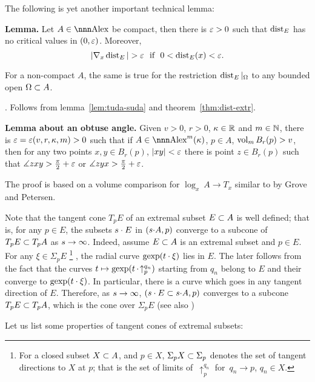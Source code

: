 \documentclass{article}
\begin{document}
The following is yet another important technical lemma:

\begin{thm} {\bf Lemma.} {\rm \cite[3.1(2)]{perelman-petrunin:extremal}}
\label{lem:dist-to-extr}
Let $A\in\Alex$ be compact, then there is $\varepsilon>0$
such that $\operatorname{dist}_E$ has no critical values in $(0,\varepsilon)$. 
Moreover,
$$|\nabla_x\dist_E|>\eps\ \ \text{if}\ \ 0<\dist_E(x)<\eps.$$

For a non-compact $A$,  the same is true for the restriction
 $\operatorname{dist}_E|_\Omega$ to any bounded open $\Omega\subset A$.
\end{thm}



\Proof. Follows from lemma~\ref{lem:tuda-suda} and
theorem~\ref{thm:dist-extr}.\qeds


\begin{thm}{\bf Lemma about an obtuse angle.} \label{lem:tuda-suda} Given $v>0$, $r>0$,
$\kappa\in\mathbb{R}$ and $m\in\mathbb{N}$, there is $\varepsilon=\varepsilon(v,r,\kappa,m)>0$ such that if
$A\in\Alex^m(\kappa)$, $p\in A$, $\operatorname{vol}_m B_r(p)>v$, then for any two points
$x,y\in B_r(p)$, $|x y|<\varepsilon$ there is point $z\in B_r(p)$ such that $\measuredangle z x
y>\tfrac\pi2+\varepsilon$ or $\measuredangle z y x>\tfrac\pi2+\varepsilon$.
\end{thm}
The proof is based on a volume comparison for $\log_x\:A\to T_x$ similar to \cite[lemma 1.3]{grove-petersen:finiteness} by Grove and Petersen.

Note that the tangent cone \label{T_pE}$T_p E$ of an extremal subset $E\subset A$ is well defined; 
that is,
for any $p\in E$, the subsets $s\cdot E$ in $(s{\cdot} A,p)$ converge to a subcone of $T_p E\subset T_p A$ as
$s\to\infty$.
Indeed, assume $E\subset A$ is an extremal subset and $p\in E$.
For any $\xi\in \Sigma_p E$%
\footnote{\label{U_pX}For a closed subset $X\subset A$, and $p\in X$, $\Sigma_p X\subset \Sigma_p$ denotes the set of tangent directions to $X$ at $p$;
that is the
set of limits of~$\uparrow_p^{q_n}$ for~$q_n\to p$, $q_n\in X$.}%
, the radial curve $\operatorname{gexp}(t\cdot\xi)$ lies in $E$.%
The later follows from the fact that the curves 
$t\mapsto\operatorname{gexp}(t\,\cdot\!\uparrow_p^{q_n})$ starting from $q_n$ belong to $E$
and their converge to $\operatorname{gexp}(t\cdot\xi)$.
In particular, there is a curve which goes in any tangent direction of $E$.
Therefore, as $s\to\infty$,  $(s\cdot E\subset s{\cdot} A,p)$ converges to
a subcone $T_p E\subset T_p A$, 
which is the cone over $\Sigma_p E$ (see also
\cite[3.3]{perelman-petrunin:extremal})

Let us list some properties of tangent cones of extremal subsets:
\end{document}
